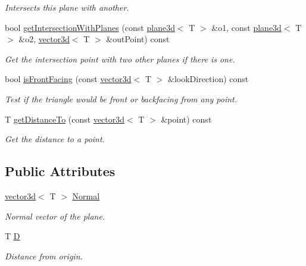 \begin{DoxyCompactItemize}
\begin{DoxyCompactList}\small\item\em Intersects this plane with another. \end{DoxyCompactList}\item 
\mbox{\label{classirr_1_1core_1_1plane3d_aa211e140706ba340cc413e1dfc095efd}} 
bool \hyperlink{classirr_1_1core_1_1plane3d_aa211e140706ba340cc413e1dfc095efd}{get\+Intersection\+With\+Planes} (const \hyperlink{classirr_1_1core_1_1plane3d}{plane3d}$<$ T $>$ \&o1, const \hyperlink{classirr_1_1core_1_1plane3d}{plane3d}$<$ T $>$ \&o2, \hyperlink{classirr_1_1core_1_1vector3d}{vector3d}$<$ T $>$ \&out\+Point) const
\begin{DoxyCompactList}\small\item\em Get the intersection point with two other planes if there is one. \end{DoxyCompactList}\item 
bool \hyperlink{classirr_1_1core_1_1plane3d_aca0237b25cbf4fe13d87b14a04d68df9}{is\+Front\+Facing} (const \hyperlink{classirr_1_1core_1_1vector3d}{vector3d}$<$ T $>$ \&look\+Direction) const
\begin{DoxyCompactList}\small\item\em Test if the triangle would be front or backfacing from any point. \end{DoxyCompactList}\item 
T \hyperlink{classirr_1_1core_1_1plane3d_ab5e41d5843bf3bb856f543186b8a7df8}{get\+Distance\+To} (const \hyperlink{classirr_1_1core_1_1vector3d}{vector3d}$<$ T $>$ \&point) const
\begin{DoxyCompactList}\small\item\em Get the distance to a point. \end{DoxyCompactList}\end{DoxyCompactItemize}
\subsection*{Public Attributes}
\begin{DoxyCompactItemize}
\item 
\mbox{\label{classirr_1_1core_1_1plane3d_a932ca6e90e55cdceedb4f15ab706b719}} 
\hyperlink{classirr_1_1core_1_1vector3d}{vector3d}$<$ T $>$ \hyperlink{classirr_1_1core_1_1plane3d_a932ca6e90e55cdceedb4f15ab706b719}{Normal}
\begin{DoxyCompactList}\small\item\em Normal vector of the plane. \end{DoxyCompactList}\item 
\mbox{\label{classirr_1_1core_1_1plane3d_afa304cf77cf1a3aae2351d5add5606a8}} 
T \hyperlink{classirr_1_1core_1_1plane3d_afa304cf77cf1a3aae2351d5add5606a8}{D}
\begin{DoxyCompactList}\small\item\em Distance from origin. \end{DoxyCompactList}\end{DoxyCompactItemize}



